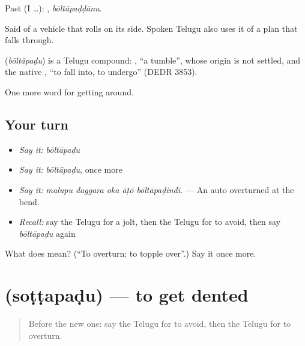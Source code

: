 Past (I …): , \emph{bōltāpaḍḍānu}.

Said of a vehicle that rolls on its side. Spoken Telugu also uses it of a plan that falls through.

\begin{cousinweb}
\textbf{} (\emph{bōltāpaḍu}) is a Telugu compound: , \textquotedblleft{}a tumble\textquotedblright{}, whose origin is not settled, and the native , \textquotedblleft{}to fall into, to undergo\textquotedblright{} (DEDR 3853).
\end{cousinweb}

\begin{grammarlens}[title={What you've built}]
One more word for getting around.
\end{grammarlens}

\subsection*{Your turn}
\begin{itemize}
\raggedright
  \item \emph{Say it:} \emph{bōltāpaḍu}
  \item \emph{Say it:} \emph{bōltāpaḍu}, once more
  \item \emph{Say it:} \emph{malupu daggara oka āṭō bōltāpaḍindi.} — An auto overturned at the bend.
  \item \emph{Recall:} say the Telugu for a jolt, then the Telugu for to avoid, then say \emph{bōltāpaḍu} again
\end{itemize}

\begin{tcolorbox}[breakable,colback=teal!4,colframe=teal!35!black,title={Before you move on}]
What does  mean? (\textquotedblleft{}To overturn; to topple over\textquotedblright{}.) Say it once more.
\end{tcolorbox}
\section[\texorpdfstring{\te{సొట్టపడు} (soṭṭapaḍu)}{సొట్టపడు (soṭṭapaḍu)}]{ (soṭṭapaḍu) — to get dented}

\label{lesson:TE-C446-sottapadu}



\begin{quote}
Before the new one: say the Telugu for to avoid, then the Telugu for to overturn.
\end{quote}


